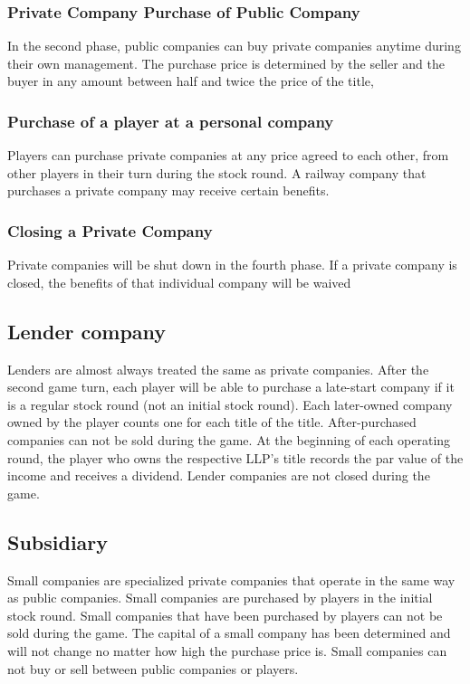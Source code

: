 \documentclass{article}
\begin{document}
\begin{CJK}{UTF8}{min}
\subsubsection{Private Company Purchase of Public Company}
In the second phase, public companies can buy private companies
anytime during their own management. The purchase price is determined
by the seller and the buyer in any amount between half and twice the
price of the title,

\subsubsection{Purchase of a player at a personal company}
Players can purchase private companies at any price agreed to each
other, from other players in their turn during the stock round. A
railway company that purchases a private company may receive certain
benefits.

\subsubsection{Closing a Private Company}
Private companies will be shut down in the fourth phase. If a private
company is closed, the benefits of that individual company will be
waived

\subsection{Lender company}
Lenders are almost always treated the same as private companies. After
the second game turn, each player will be able to purchase a
late-start company if it is a regular stock round (not an initial
stock round). Each later-owned company owned by the player counts one
for each title of the title. After-purchased companies can not be sold
during the game. At the beginning of each operating round, the player
who owns the respective LLP's title records the par value of the
income and receives a dividend. Lender companies are not closed during
the game.

\subsection{Subsidiary}
Small companies are specialized private companies that operate in the
same way as public companies. Small companies are purchased by players
in the initial stock round. Small companies that have been purchased
by players can not be sold during the game. The capital of a small
company has been determined and will not change no matter how high the
purchase price is. Small companies can not buy or sell between public
companies or players.


\end{CJK}
\end{document}
